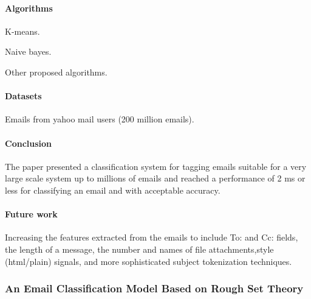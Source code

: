 \documentclass[12pt]{article}
\newenvironment{my_itemize}
{\begin{itemize}
  \setlength{\itemsep}{0cm}
  \setlength{\parskip}{0cm}}
{\end{itemize}}
\begin{document}
\paragraph{Algorithms}
\begin{my_itemize}
  \item K-means.
  \item Naive bayes.
  \item Other proposed algorithms.
\end{my_itemize}

\paragraph{Datasets}
\begin{my_itemize}
  \item Emails from yahoo mail users (200 million emails).
\end{my_itemize}


\paragraph{Conclusion}
\begin{my_itemize}
  \item The paper presented a classification system for tagging emails suitable for a very 
	large scale system up to millions of emails and reached a performance of 2 ms or 
	less for classifying an email and with acceptable accuracy.
\end{my_itemize}

\paragraph{Future work}
\begin{my_itemize}
  \item Increasing the features extracted from the emails to include To: and Cc: fields,
	the length of a message, the number and names of file attachments,style (html/plain) signals, 
	and more sophisticated subject tokenization techniques.
\end{my_itemize}



\subsubsection{An Email Classification Model Based on Rough Set Theory \cite{WENQING05}}
\end{document}
